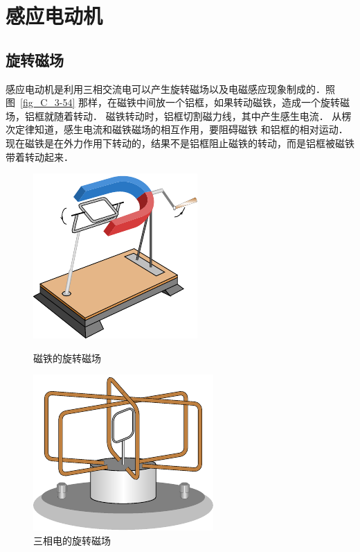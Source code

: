 \section{感应电动机}
\subsection{旋转磁场}

感应电动机是利用三相交流电可以产生旋转磁场以及电磁感应现象制成的．照图~\ref{fig_C_3-54} 那样，在磁铁中间放一个铝框，如果转动磁铁，造成一个旋转磁场，铝框就随着转动．
磁铁转动时，铝框切割磁力线，其中产生感生电流．
从楞次定律知道，感生电流和磁铁磁场的相互作用，要阻碍磁铁
和铝框的相对运动．
现在磁铁是在外力作用下转动的，结果不是铝框阻止磁铁的转动，而是铝框被磁铁带着转动起来．

\begin{figure}[htbp]
    \centering
    \begin{minipage}[t]{0.48\textwidth}
        \centering
        \includegraphics{fig/C/3-54.pdf}
        \caption{磁铁的旋转磁场}\label{fig_C_3-54}
    \end{minipage}
    \begin{minipage}[t]{0.48\textwidth}
        \centering
        \includegraphics{fig/C/3-55.pdf}
        \caption{三相电的旋转磁场}\label{fig_C_3-55}
    \end{minipage}
\end{figure}

